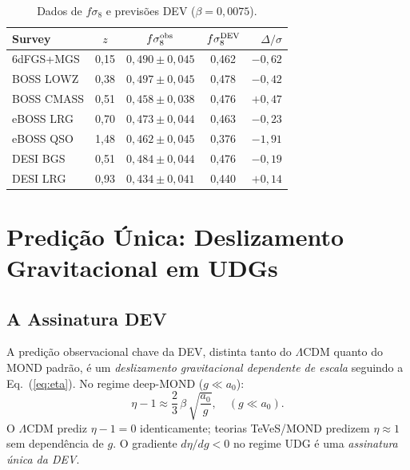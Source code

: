 \documentclass[aps,prd,twocolumn,showpacs,superscriptaddress]{revtex4-2}
\newcommand{\aO}{a_0}
\newcommand{\LCDM}{$\Lambda$CDM}
\begin{document}
\begin{table}[h]
\caption{Dados de $f\sigma_8$ e previsões DEV ($\beta=0{,}0075$).}
\label{tab:fsigma8}
\begin{ruledtabular}
\begin{tabular}{lcccr}
Survey & $z$ & $f\sigma_8^{\rm obs}$ & $f\sigma_8^{\rm DEV}$ & $\Delta/\sigma$ \\
\hline
6dFGS+MGS    & 0,15 & $0{,}490\pm0{,}045$ & 0,462 & $-0{,}62$ \\
BOSS LOWZ    & 0,38 & $0{,}497\pm0{,}045$ & 0,478 & $-0{,}42$ \\
BOSS CMASS   & 0,51 & $0{,}458\pm0{,}038$ & 0,476 & $+0{,}47$ \\
eBOSS LRG   & 0,70 & $0{,}473\pm0{,}044$ & 0,463 & $-0{,}23$ \\
eBOSS QSO   & 1,48 & $0{,}462\pm0{,}045$ & 0,376 & $-1{,}91$ \\
DESI BGS    & 0,51 & $0{,}484\pm0{,}044$ & 0,476 & $-0{,}19$ \\
DESI LRG    & 0,93 & $0{,}434\pm0{,}041$ & 0,440 & $+0{,}14$ \\
\end{tabular}
\end{ruledtabular}
\end{table}

\section{Predição Única: Deslizamento Gravitacional em UDGs}
\label{sec:udg}

\subsection{A Assinatura DEV}

A predição observacional chave da DEV, distinta tanto do \LCDM{}
quanto do MOND padrão, é um \emph{deslizamento gravitacional
dependente de escala} seguindo a Eq.~(\ref{eq:eta}).
No regime deep-MOND ($g \ll \aO$):
\begin{equation}
  \eta - 1 \approx \frac{2}{3}\,\beta\,\sqrt{\frac{\aO}{g}},
  \quad (g \ll \aO).
  \label{eq:etadeep}
\end{equation}
O \LCDM{} prediz $\eta - 1 = 0$ identicamente;
teorias TeVeS/MOND predizem $\eta \approx 1$ sem dependência de $g$.
O gradiente $d\eta/dg < 0$ no regime UDG é uma
\emph{assinatura única da DEV}.
\end{document}

